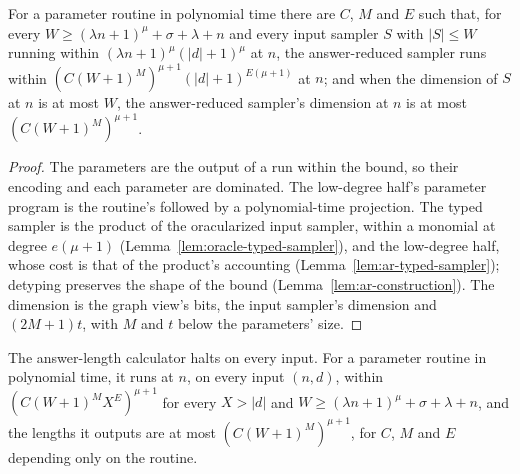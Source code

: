 \begin{lemma}
\label{lem:ar-sampler-time}
\leanok
For a parameter routine in polynomial time there are $C$, $M$ and $E$ such that, for every
$W \geq (\lambda n + 1)^\mu + \sigma + \lambda + n$ and every input sampler $S$ with $|S| \leq W$
running within $(\lambda n + 1)^\mu (|d| + 1)^\mu$ at $n$, the answer-reduced sampler runs within
$(C (W + 1)^M)^{\mu + 1} (|d| + 1)^{E (\mu + 1)}$ at $n$; and when the dimension of $S$ at $n$ is
at most $W$, the answer-reduced sampler's dimension at $n$ is at most $(C (W + 1)^M)^{\mu + 1}$.
\end{lemma}

\begin{proof}
\leanok
The parameters are the output of a run within the bound, so their encoding and each parameter
are dominated. The low-degree half's parameter program is the routine's followed by a
polynomial-time projection. The typed sampler is the product of the oracularized input sampler,
within a monomial at degree $e (\mu + 1)$ (Lemma~\ref{lem:oracle-typed-sampler}), and the
low-degree half, whose cost is that of the product's accounting
(Lemma~\ref{lem:ar-typed-sampler}); detyping preserves the shape of the bound
(Lemma~\ref{lem:ar-construction}). The dimension is the graph view's bits, the input sampler's
dimension and $(2 M + 1) t$, with $M$ and $t$ below the parameters' size.
\end{proof}

\begin{lemma}
\label{lem:ar-len-time}
\leanok
The answer-length calculator halts on every input. For a parameter routine in polynomial time,
it runs at $n$, on every input $(n, d)$, within $(C (W + 1)^M X^E)^{\mu + 1}$ for every $X > |d|$
and $W \geq (\lambda n + 1)^\mu + \sigma + \lambda + n$, and the lengths it outputs are at most
$(C (W + 1)^M)^{\mu + 1}$, for $C$, $M$ and $E$ depending only on the routine.
\end{lemma}

